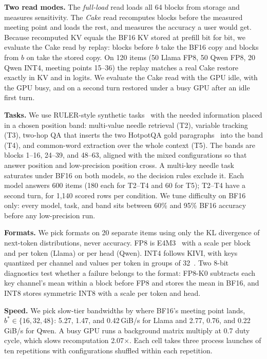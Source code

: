 \documentclass[conference]{IEEEtran}
\newcommand{\cfg}[1]{\textsf{#1}}
\begin{document}
\textbf{Two read modes.}
The \emph{full-load} read loads all 64 blocks from storage and measures sensitivity.
The \emph{Cake} read recomputes blocks before the measured meeting point and loads the rest, and measures the accuracy a user would get.
Because recomputed KV equals the BF16 KV stored at prefill bit for bit, we evaluate the Cake read by replay: blocks before $b$ take the BF16 copy and blocks from $b$ on take the stored copy.
On 120 items (50 Llama FP8, 50 Qwen FP8, 20 Qwen INT4, meeting points 15--36) the replay matches a real Cake restore exactly in KV and in logits.
We evaluate the Cake read with the GPU idle, with the GPU busy, and on a second turn restored under a busy GPU after an idle first turn.

\textbf{Tasks.}
We use RULER-style synthetic tasks~\cite{ruler2024} with the needed information placed in a chosen position band: multi-value needle retrieval (T2), variable tracking (T3), two-hop QA that inserts the two HotpotQA gold paragraphs~\cite{hotpotqa2018} into the band (T4), and common-word extraction over the whole context (T5).
The bands are blocks 1--16, 24--39, and 48--63, aligned with the mixed configurations so that answer position and low-precision position cross.
A multi-key needle task saturates under BF16 on both models, so the decision rules exclude it.
Each model answers 600 items (180 each for T2--T4 and 60 for T5); T2--T4 have a second turn, for 1,140 scored rows per condition.
We tune difficulty on BF16 only: every model, task, and band sits between 60\% and 95\% BF16 accuracy before any low-precision run.

\textbf{Formats.}
We pick formats on 20 separate items using only the KL divergence of next-token distributions, never accuracy.
FP8 is E4M3~\cite{fp8formats2022} with a scale per block and per token (Llama) or per head (Qwen).
INT4 follows KIVI, with keys quantized per channel and values per token in groups of 32~\cite{kivi2024}.
Two 8-bit diagnostics test whether a failure belongs to the format: \cfg{FP8-K0} subtracts each key channel's mean within a block before FP8 and stores the mean in BF16, and \cfg{INT8} stores symmetric INT8 with a scale per token and head.

\textbf{Speed.}
We pick slow-tier bandwidths by where BF16's meeting point lands, $b^\ast\in\{16,32,48\}$: 5.27, 1.47, and 0.42\,GiB/s for Llama and 2.77, 0.76, and 0.22\,GiB/s for Qwen.
A busy GPU runs a background matrix multiply at 0.7 duty cycle, which slows recomputation 2.07$\times$.
Each cell takes three process launches of ten repetitions with configurations shuffled within each repetition.
\end{document}
